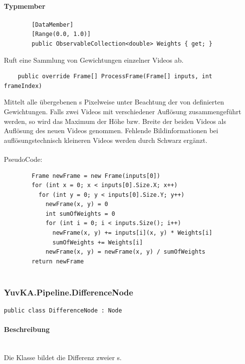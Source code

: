 \paragraph{Typmember}
\begin{itemize}

	\begin{verbatim}
		[DataMember]
		[Range(0.0, 1.0)]
		public ObservableCollection<double> Weights { get; }
	\end{verbatim}
	Ruft eine Sammlung von Gewichtungen einzelner Videos ab.

	\begin{verbatim}
	public override Frame[] ProcessFrame(Frame[] inputs, int frameIndex)
	\end{verbatim}
	Mittelt alle übergebenen s Pixelweise unter Beachtung der von  definierten Gewichtungen. Falls zwei Videos mit verschiedener Auflösung zusammengeführt werden, so wird das Maximum der Höhe bzw. Breite der beiden Videos als Auflösung des neuen Videos genommen. Fehlende Bildinformationen bei auflösungstechnisch kleineren Videos werden durch Schwarz ergänzt.\\~\\
	PseudoCode:
	\begin{verbatim}
		Frame newFrame = new Frame(inputs[0])
		for (int x = 0; x < inputs[0].Size.X; x++)
		  for (int y = 0; y < inputs[0].Size.Y; y++)
		    newFrame(x, y) = 0
		    int sumOfWeights = 0
		    for (int i = 0; i < inputs.Size(); i++)
		      newFrame(x, y) += inputs[i](x, y) * Weights[i]
		      sumOfWeights += Weights[i]
		    newFrame(x, y) = newFrame(x, y) / sumOfWeights
		return newFrame
		
	\end{verbatim}
	
\end{itemize}

\subsubsection{YuvKA.Pipeline.DifferenceNode}

\begin{verbatim}
public class DifferenceNode : Node
\end{verbatim}

\paragraph{Beschreibung}~\\
Die Klasse  bildet die Differenz zweier s.

